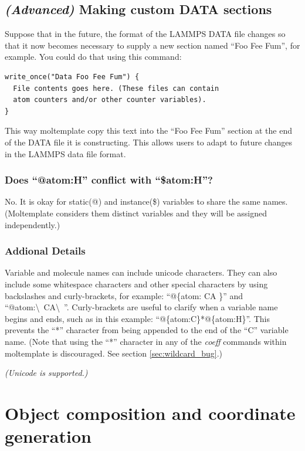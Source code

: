 \documentclass[11pt]{article}
\begin{document}
\subsection{\textit{(Advanced)} Making custom DATA sections}
\label{sec:custom_data}
Suppose that in the future, the format of the LAMMPS DATA file changes
so that it now becomes necessary to supply a new section named ``Foo Fee Fum'',
for example.  You could do that using this command:
\begin{verbatim}
write_once("Data Foo Fee Fum") {
  File contents goes here. (These files can contain
  atom counters and/or other counter variables).
}
\end{verbatim}
This way moltemplate copy this text into the ``Foo Fee Fum'' section at
the end of the DATA file it is constructing.
This allows users to adapt to future changes in the LAMMPS data file format.



\subsubsection*{Does ``@atom:H'' conflict with ``\$atom:H''?}
\label{sec:vardetails}
No.  It is okay for static(@) and instance(\$) variables to share the same names.
(Moltemplate considers them distinct variables and they will be assigned independently.)


\subsubsection*{Addional Details}
Variable and molecule names can include unicode characters.
They can also include some whitespace characters and other special characters
by using backslashes and curly-brackets, for example:
``@\{atom: CA \}'' and ``@atom:\textbackslash\ CA\textbackslash\ ''.
Curly-brackets are useful to clarify when a variable name begins and ends,
such as in this example: ``@\{atom:C\}*@\{atom:H\}''.
This prevents the ``*'' character from being appended to the end of the 
``C'' variable name.
(Note that using the ``*'' character in any of the \textit{coeff} commands
within moltemplate is discouraged.  See section \ref{sec:wildcard_bug}.)

\textit{(Unicode is supported.)}


\pagebreak
\section{ Object composition and coordinate generation }
\label{sec:coordinates}
\end{document}
